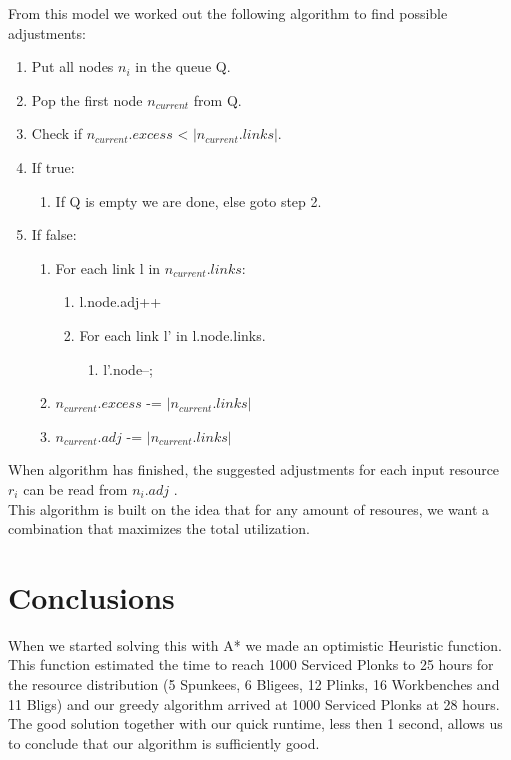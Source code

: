\documentclass{article}
\begin{document}
From this model we worked out the following algorithm to find possible adjustments:
\begin{enumerate}
	\item Put all nodes $n_i$ in the queue Q.
	\item Pop the first node $n_{current}$ from Q.
	\item Check if $n_{current}.excess$ < $|n_{current}.links|$.
	\item If true:
		\begin{enumerate}
			\item If Q is empty we are done, else goto step 2.
		\end{enumerate}
	\item If false:
		\begin{enumerate}
			\item For each link l in $n_{current}.links$:
				\begin{enumerate}
					\item l.node.adj++
					\item For each link l' in l.node.links.
						\begin{enumerate}
							\item l'.node--;
						\end{enumerate}
				\end{enumerate}
			\item $n_{current}.excess$ -= $|n_{current}.links|$
			\item $n_{current}.adj$ -= $|n_{current}.links|$
		\end{enumerate}
\end{enumerate}

When algorithm has finished, the suggested adjustments for each input resource $r_i$ can be read from $n_{i}.adj$ .
\\[2ex]
This algorithm is built on the idea that for any amount of resoures, we want a combination that maximizes the total utilization.


\section*{Conclusions}
When we started solving this with A* we made an optimistic Heuristic function. This function estimated the time to reach 1000 Serviced Plonks to 25 hours for the resource distribution (5 Spunkees, 6 Bligees, 12 Plinks, 16 Workbenches and 11 Bligs) and our greedy algorithm arrived at 1000 Serviced Plonks at 28 hours.
\\[2ex]
The good solution together with our quick runtime, less then 1 second, allows us to conclude that our algorithm is sufficiently good.
\end{document}
